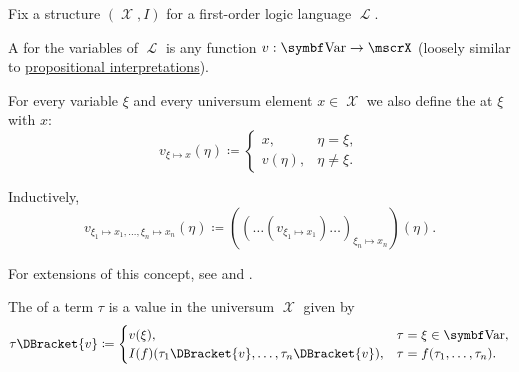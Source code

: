 \begin{definition}\label{def:first_order_valuation}
  Fix a structure \( (\mscrX, I) \) for a first-order logic language \( \mscrL \).

  \begin{DefEnum}
     A  for the variables of \( \mscrL \) is any function \( v: \Bold{Var} \to \mscrX \) (loosely similar to \hyperref[def:propositional_valuation/interpretation]{propositional interpretations}).

     For every variable \( \xi \) and every universum element \( x \in \mscrX \) we also define the  at \( \xi \) with \( x \):
    \begin{equation*}
      v_{\xi \mapsto x}(\eta) \coloneqq \begin{cases}
        x,       &\eta = \xi, \\
        v(\eta), &\eta \neq \xi.
      \end{cases}
    \end{equation*}

    Inductively\IND,
    \begin{equation*}
      v_{\xi_1 \mapsto x_1, \ldots, \xi_n \mapsto x_n}(\eta) \coloneqq ((\ldots(v_{\xi_1 \mapsto x_1})\ldots)_{\xi_n \mapsto x_n})(\eta).
    \end{equation*}

    For extensions of this concept, see  and .

     The  of a term \( \tau \) is a value in the universum \( \mscrX \) given by
    \begin{equation}\label{eq:def:first_order_valuation/term_valuation}
      \tau\DBracket{v} \coloneqq \begin{cases}
        v(\xi),                                     &\tau = \xi \in \Bold{Var}, \\
        I(f)(\tau_1\DBracket{v}, \ldots, \tau_n\DBracket{v}), &\tau = f(\tau_1, \ldots, \tau_n).
      \end{cases}
    \end{equation}


\end{DefEnum}
\end{definition}
